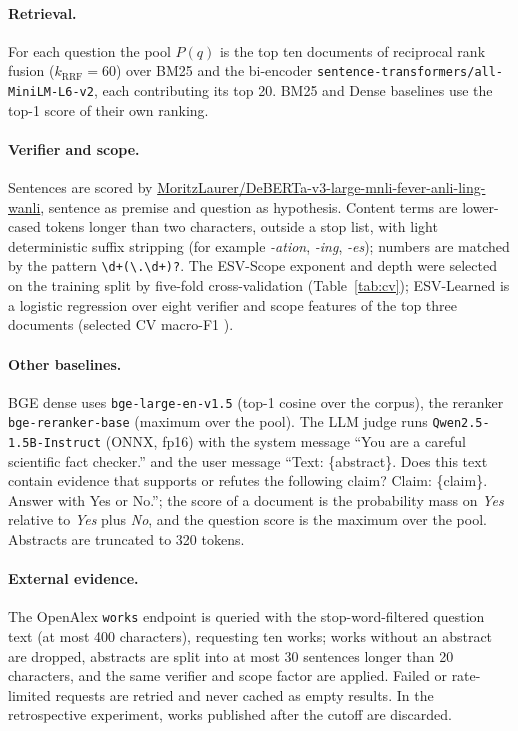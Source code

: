 \documentclass[10pt,a4paper]{article}
\theoremstyle{definition}
\theoremstyle{remark}
\begin{document}
\paragraph{Retrieval.} For each question the pool $P(q)$ is the top ten documents of reciprocal rank fusion ($k_{\mathrm{RRF}}=60$) over BM25 and the bi-encoder \texttt{sentence-transformers/all-MiniLM-L6-v2}, each contributing its top 20. BM25 and Dense baselines use the top-1 score of their own ranking.

\paragraph{Verifier and scope.} Sentences are scored by \url{MoritzLaurer/DeBERTa-v3-large-mnli-fever-anli-ling-wanli}, sentence as premise and question as hypothesis. Content terms are lower-cased tokens longer than two characters, outside a stop list, with light deterministic suffix stripping (for example \emph{-ation}, \emph{-ing}, \emph{-es}); numbers are matched by the pattern \verb|\d+(\.\d+)?|. The ESV-Scope exponent and depth were selected on the training split by five-fold cross-validation (Table~\ref{tab:cv}); ESV-Learned is a logistic regression over eight verifier and scope features of the top three documents (selected CV macro-F1 \SuppCVsel{}).

\paragraph{Other baselines.} BGE dense uses \texttt{bge-large-en-v1.5} (top-1 cosine over the corpus), the reranker \texttt{bge-reranker-base} (maximum over the pool). The LLM judge runs \texttt{Qwen2.5-1.5B-Instruct} (ONNX, fp16) with the system message ``You are a careful scientific fact checker.'' and the user message ``Text: \{abstract\}. Does this text contain evidence that supports or refutes the following claim? Claim: \{claim\}. Answer with Yes or No.''; the score of a document is the probability mass on \emph{Yes} relative to \emph{Yes} plus \emph{No}, and the question score is the maximum over the pool. Abstracts are truncated to 320 tokens.

\paragraph{External evidence.} The OpenAlex \texttt{works} endpoint is queried with the stop-word-filtered question text (at most 400 characters), requesting ten works; works without an abstract are dropped, abstracts are split into at most 30 sentences longer than 20 characters, and the same verifier and scope factor are applied. Failed or rate-limited requests are retried and never cached as empty results. In the retrospective experiment, works published after the cutoff are discarded.
\end{document}
